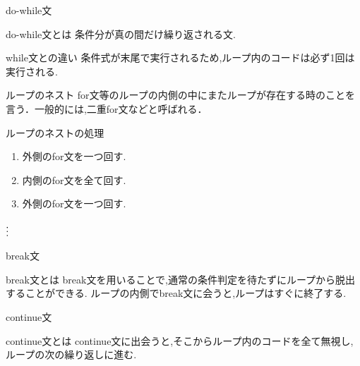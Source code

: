 \begin{frame}[fragile]{do-while文}
    \begin{block}{do-while文とは}
        条件分が真の間だけ繰り返される文.
    \end{block}
    
    
    \begin{block}{while文との違い}
        条件式が末尾で実行されるため,ループ内のコードは必ず1回は実行される.
    \end{block}
\end{frame}

\begin{frame}[fragile]{ループのネスト}
    for文等のループの内側の中にまたループが存在する時のことを言う．一般的には,二重for文などと呼ばれる．
    
    
    \begin{block}{ループのネストの処理}
        \begin{enumerate}
            \item 外側のfor文を一つ回す.
            \item 内側のfor文を全て回す.
            \item 外側のfor文を一つ回す.
        \end{enumerate}
        \centering
        $\textbf{\vdots}$
    \end{block}
\end{frame}

\begin{frame}[fragile]{break文}
    \begin{block}{break文とは}
        break文を用いることで,通常の条件判定を待たずにループから脱出することができる.
        ループの内側でbreak文に会うと,ループはすぐに終了する.
    \end{block}
    \begin{minipage}{\linewidth}
        
        
    \end{minipage}    

\end{frame}

\begin{frame}[fragile]{continue文}
\begin{block}{continue文とは}
    continue文に出会うと,そこからループ内のコードを全て無視し,ループの次の繰り返しに進む.
\end{block}
    \begin{minipage}{\linewidth}
        
        
    \end{minipage}
\end{frame}

